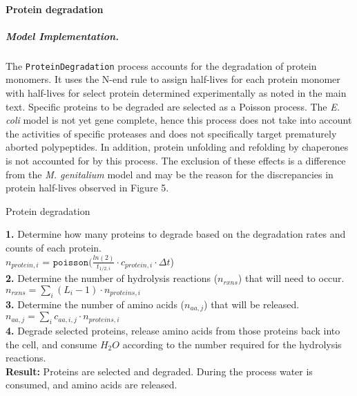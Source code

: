 \documentclass[12pt]{article}
\begin{document}
\baselineskip24pt

\paragraph{Protein degradation}

\subparagraph{Model Implementation.}
The \texttt{ProteinDegradation} process accounts for the degradation of protein monomers. It uses the N-end rule \cite{Tobias:1991tz} to assign half-lives for each protein monomer with half-lives for select protein determined experimentally as noted in the main text. Specific proteins to be degraded are selected as a Poisson process. The \emph{E. coli} model is not yet gene complete, hence this process does not take into account the activities of specific proteases and does not specifically target prematurely aborted polypeptides. In addition, protein unfolding and refolding by chaperones is not accounted for by this process. The exclusion of these effects is a difference from the \textit{M. genitalium} model and may be the reason for the discrepancies in protein half-lives observed in Figure 5.\\

\begin{algorithm}[H]
\caption{Protein degradation}

    \textbf{1.} Determine how many proteins to degrade based on the degradation rates and counts of each protein. \\
    \-\hspace{1cm} $n_{protein, i}$ = $\texttt{poisson}(\frac{ln(2)}{t_{1/2,i}} \cdot c_{protein, i} \cdot \Delta t$)\\
    \textbf{2.} Determine the number of hydrolysis reactions ($n_{rxns}$) that will need to occur.\\
    \-\hspace{1cm} $n_{rxns} = \sum\limits_i (L_i - 1) \cdot n_{proteins,i}$\\

    \textbf{3.} Determine the number of amino acids ($n_{aa,j}$) that will be released.\\
    \-\hspace{1cm} $n_{aa,j} = \sum\limits_i c_{aa,i,j} \cdot n_{proteins,i}$\\
    \textbf{4.} Degrade selected proteins, release amino acids from those proteins back into the cell, and consume $H_2O$ according to the number required for the hydrolysis reactions.\\
    \textbf{Result:} Proteins are selected and degraded. During the process water is consumed, and amino acids are released.
\end{algorithm}
\end{document}
